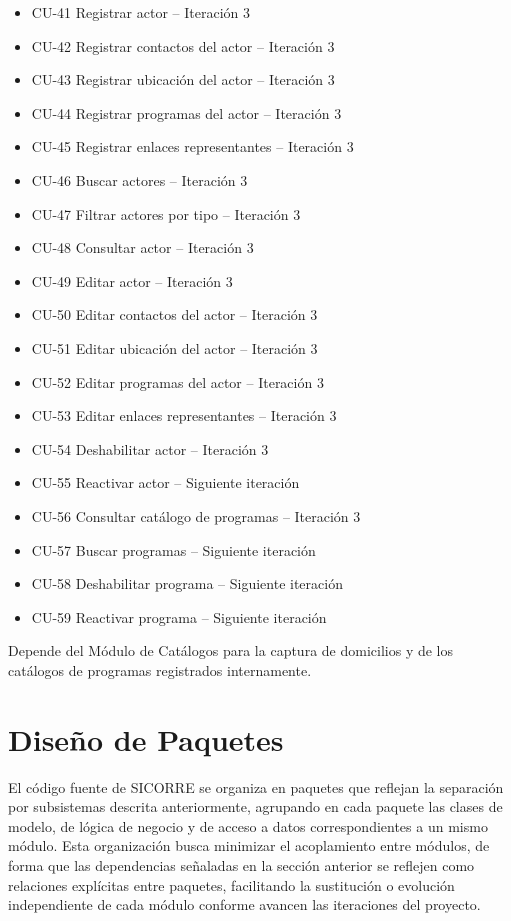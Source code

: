 \begin{itemize}
	\item CU-41 Registrar actor -- Iteración 3
	\item CU-42 Registrar contactos del actor -- Iteración 3
	\item CU-43 Registrar ubicación del actor -- Iteración 3
	\item CU-44 Registrar programas del actor -- Iteración 3
	\item CU-45 Registrar enlaces representantes -- Iteración 3
	\item CU-46 Buscar actores -- Iteración 3
	\item CU-47 Filtrar actores por tipo -- Iteración 3
	\item CU-48 Consultar actor -- Iteración 3
	\item CU-49 Editar actor -- Iteración 3
	\item CU-50 Editar contactos del actor -- Iteración 3
	\item CU-51 Editar ubicación del actor -- Iteración 3
	\item CU-52 Editar programas del actor -- Iteración 3
	\item CU-53 Editar enlaces representantes -- Iteración 3
	\item CU-54 Deshabilitar actor -- Iteración 3
	\item CU-55 Reactivar actor -- Siguiente iteración
	\item CU-56 Consultar catálogo de programas -- Iteración 3
	\item CU-57 Buscar programas -- Siguiente iteración
	\item CU-58 Deshabilitar programa -- Siguiente iteración
	\item CU-59 Reactivar programa -- Siguiente iteración
\end{itemize}
Depende del Módulo de Catálogos para la captura de domicilios y de los catálogos de programas registrados internamente.

\section{Diseño de Paquetes}

El código fuente de SICORRE se organiza en paquetes que reflejan la separación por subsistemas descrita anteriormente, agrupando en cada paquete las clases de modelo, de lógica de negocio y de acceso a datos correspondientes a un mismo módulo. Esta organización busca minimizar el acoplamiento entre módulos, de forma que las dependencias señaladas en la sección anterior se reflejen como relaciones explícitas entre paquetes, facilitando la sustitución o evolución independiente de cada módulo conforme avancen las iteraciones del proyecto.

